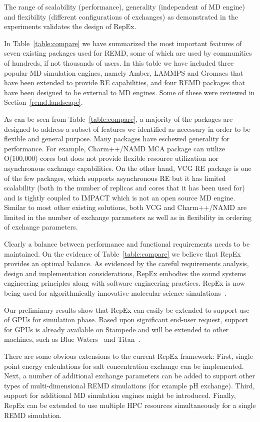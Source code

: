 \documentclass{sig-alternate-05-2015}
\begin{document}
The range of scalability (performance), generality (independent of MD engine) and flexibility (different configurations of exchanges) as demonstrated in the experiments validates the design of RepEx. 

In Table~\ref{table:compare} we have summarized the most important features of seven existing packages used for REMD, some of which are used by communities of hundreds, if not thousands of users. In this table we have included three popular MD simulation engines, namely Amber, LAMMPS and Gromacs that have been extended to provide RE capabilities, and four REMD packages that have been designed to be external to MD engines. Some of these were reviewed in Section~\ref{remd.landscape}.

As can be seen from Table~\ref{table:compare}, a majority of the packages are designed to address a subset of features we identified as necessary in order to be flexible and general purpose. Many packages have eschewed generality for performance. For example, Charm++/NAMD MCA package can utilize O(100,000) cores but does not provide flexible resource utilization nor asynchronous exchange capabilities. On the other hand, VCG RE package is one of the few packages, which supports asynchronous RE but it has limited scalability (both in the number of replicas and cores that it has been used for) and is tightly coupled to IMPACT which is not an open source MD engine. Similar to most other existing solutions, both VCG and Charm++/NAMD are limited in the number of exchange parameters as well as in flexibility in ordering of exchange parameters.

Clearly a balance between performance and functional requirements needs to be maintained.  On the evidence of Table~\ref{table:compare} we believe that RepEx provides an optimal balance.  As evidenced by the careful requirements analysis, design and implementation considerations, RepEx embodies the sound systems engineering principles along with software engineering practices.  RepEx is now being used for algorithmically innovative molecular science simulations~\cite{ct500776j}.
    
Our preliminary results show that RepEx can easily be extended to support use of GPUs for simulation phase. Based upon significant end-user request, support for GPUs is already available on Stampede and will be extended to other machines, such as Blue Waters~\cite{blue.waters} and Titan~\cite{titan}.

There are some obvious extensions to the current RepEx framework: First, single point energy calculations for salt concentration exchange can be implemented. Next, a number of additional exchange parameters can be added to support other types of multi-dimensional REMD simulations (for example pH exchange). Third, support for additional MD simulation engines might be introduced. Finally, RepEx can be extended to use multiple HPC resources simultaneously for a single REMD simulation.
\end{document}
